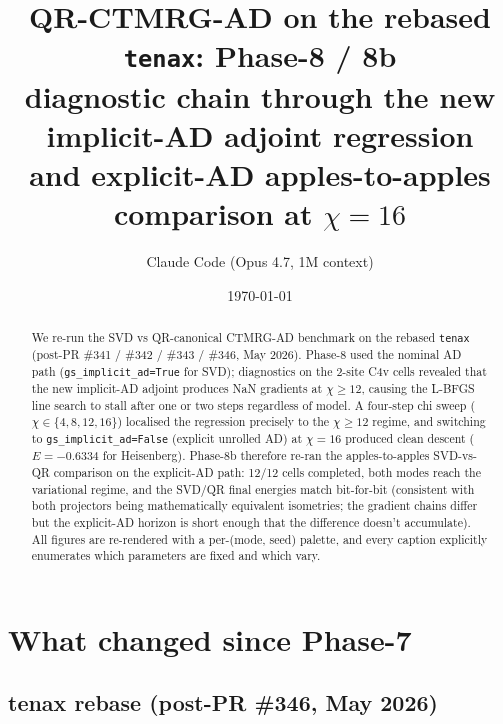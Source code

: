 \documentclass[aps,prresearch,reprint,amsmath,amssymb,floatfix]{revtex4-2}
\newcommand{\tenax}{\texttt{tenax}}
\newcommand{\code}[1]{\texttt{#1}}
\begin{document}
\title{QR-CTMRG-AD on the rebased \tenax: Phase-8 / 8b\\
\large diagnostic chain through the new implicit-AD adjoint regression\\
and explicit-AD apples-to-apples comparison at $\chi=16$}

\author{Claude Code (Opus 4.7, 1M context)}
\date{\today}

\begin{abstract}
We re-run the SVD vs QR-canonical CTMRG-AD benchmark on the rebased \tenax{}
(post-PR \#341 / \#342 / \#343 / \#346, May 2026). Phase-8 used the
nominal AD path (\code{gs\_implicit\_ad=True} for SVD); diagnostics on the
2-site C4v cells revealed that the new implicit-AD adjoint produces NaN
gradients at $\chi\!\geq\!12$, causing the L-BFGS line search to stall
after one or two steps regardless of model. A four-step chi sweep
($\chi\in\{4,8,12,16\}$) localised the regression precisely to the
$\chi\!\geq\!12$ regime, and switching to \code{gs\_implicit\_ad=False}
(explicit unrolled AD) at $\chi=16$ produced clean descent
($E=-0.6334$ for Heisenberg). Phase-8b therefore re-ran the apples-to-apples
SVD-vs-QR comparison on the explicit-AD path: 12/12 cells completed,
both modes reach the variational regime, and the SVD/QR final energies
match bit-for-bit (consistent with both projectors being mathematically
equivalent isometries; the gradient chains differ but the explicit-AD
horizon is short enough that the difference doesn't accumulate). All
figures are re-rendered with a per-(mode, seed) palette, and every
caption explicitly enumerates which parameters are fixed and which vary.
\end{abstract}

\maketitle

\section{What changed since Phase-7}

\subsection{tenax rebase (post-PR \#346, May 2026)}
\end{document}
